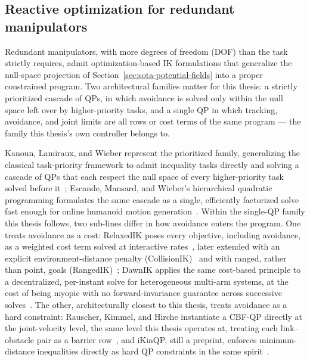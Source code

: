 \documentclass[12pt,a4paper,twoside,openright]{report}
\begin{document}
\subsection{Reactive optimization for redundant manipulators}
\label{sec:sota-optimization-ik}

Redundant manipulators, with more degrees of freedom (DOF) than the task strictly requires, admit optimization-based IK formulations that generalize the null-space projection of Section~\ref{sec:sota-potential-fields} into a proper constrained program. Two architectural families matter for this thesis: a strictly prioritized cascade of QPs, in which avoidance is solved only within the null space left over by higher-priority tasks, and a single QP in which tracking, avoidance, and joint limits are all rows or cost terms of the same program --- the family this thesis's own controller belongs to.

Kanoun, Lamiraux, and Wieber represent the prioritized family, generalizing the classical task-priority framework to admit inequality tasks directly and solving a cascade of QPs that each respect the null space of every higher-priority task solved before it~\cite{kanoun2011kinematic}; Escande, Mansard, and Wieber's hierarchical quadratic programming formulates the same cascade as a single, efficiently factorized solve fast enough for online humanoid motion generation~\cite{escande2014hierarchical}. Within the single-QP family this thesis follows, two sub-lines differ in how avoidance enters the program. One treats avoidance as a cost: RelaxedIK poses every objective, including avoidance, as a weighted cost term solved at interactive rates~\cite{rakita2018relaxedik}, later extended with an explicit environment-distance penalty (CollisionIK)~\cite{rakita2021collisionik} and with ranged, rather than point, goals (RangedIK)~\cite{wang2023rangedik}; DawnIK applies the same cost-based principle to a decentralized, per-instant solve for heterogeneous multi-arm systems, at the cost of being myopic with no forward-invariance guarantee across successive solves~\cite{marangoz2023dawnik}. The other, architecturally closest to this thesis, treats avoidance as a hard constraint: Rauscher, Kimmel, and Hirche instantiate a CBF-QP directly at the joint-velocity level, the same level this thesis operates at, treating each link--obstacle pair as a barrier row~\cite{rauscher2016constrained}, and iKinQP, still a preprint, enforces minimum-distance inequalities directly as hard QP constraints in the same spirit~\cite{ashkanazy2023ikinqp}.
\end{document}
